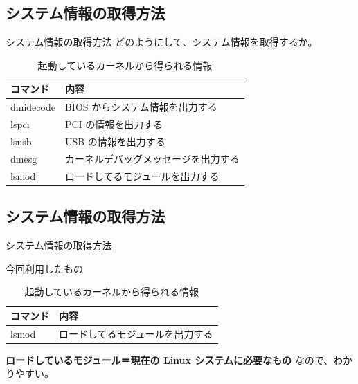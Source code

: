 \subsection{システム情報の取得方法}
\begin{frame}[containsverbatim]{システム情報の取得方法}
どのようにして、システム情報を取得するか。

\begin{table}[h]
 \begin{center}
 {
   \begin{tabular}{l|l} \hline
     コマンド & 内容  \\ \hline \hline
     dmidecode & BIOS からシステム情報を出力する \\
     lspci & PCI の情報を出力する \\
     lsusb & USB の情報を出力する \\
     dmesg & カーネルデバッグメッセージを出力する \\
     lsmod & ロードしてるモジュールを出力する \\
   \end{tabular}
 }
 \caption{起動しているカーネルから得られる情報}
 \label{kernel-output}
 \end{center}
\end{table}

\end{frame}

\subsection{システム情報の取得方法}
\begin{frame}[containsverbatim]{システム情報の取得方法}

今回利用したもの

\begin{table}[h]
 \begin{center}
 {
   \begin{tabular}{l|l} \hline
     コマンド & 内容  \\ \hline \hline
     lsmod & ロードしてるモジュールを出力する \\
   \end{tabular}
 }
 \caption{起動しているカーネルから得られる情報}
 \label{kernel-output}
 \end{center}
\end{table}


{\bf ロードしているモジュール＝現在の Linux システムに必要なもの}
なので、わかりやすい。
\end{frame}

